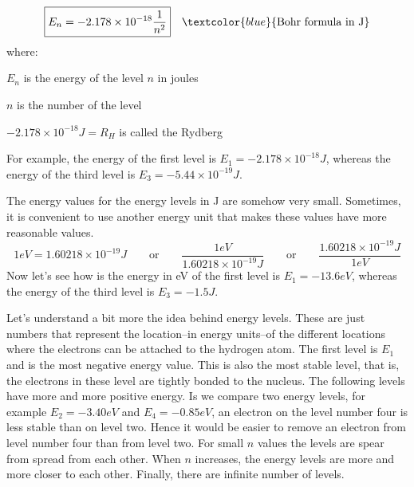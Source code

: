 \documentclass[main.tex]{subfiles}
\begin{document}
\begin{description}
\begin{equation*}
\boxed{  E_n=-2.178\times 10^{-18}  \frac{1}{n^2}  } \quad \textcolor{blue}{\text{Bohr formula in J}}
\end{equation*}
where:
\begin{where}
 \item $E_n$   is the energy of the level $n$ in joules
 \item $n$  is the number of the level
  \item $-2.178\times 10^{-18}J=R_H$  is called the Rydberg
\end{where}
For example, the energy of the first level is $E_1=-2.178\times 10^{-18}J$, whereas the energy of the third level is $E_3=-5.44\times 10^{-19}J$.
\item[\docfilehook{Electron-Volt a new unit of energy}{Electron-Volt a new unit of energy}]
The energy values for the energy levels in J are somehow very small. Sometimes, it is convenient to use another energy unit that makes these values have more reasonable values.%
\begin{equation*}
\boxed{    1 eV=1.60218\times 10^{-19} J   } \qquad\text{or}\qquad  \boxed{\frac{1 eV}{1.60218\times 10^{-19} J }}\qquad\text{or}\qquad  \boxed{\frac{1.60218\times 10^{-19} J }{1 eV}}
\end{equation*}
Now let's see how is the energy in eV of the first level is $E_1=-13.6eV$, whereas the energy of the third level is $E_3=-1.5J$.

\item[\docfilehook{Energy levels of hydrogen}{Energy levels of hydrogen}]
Let's understand a bit more the idea behind energy levels. These are just numbers that represent the location--in energy units--of the different locations where the electrons can be attached to the hydrogen atom. The first level is $E_1$ and is the most negative energy value. This is also the most stable level, that is, the electrons in these level are tightly bonded to the nucleus. The following levels have more and more positive energy. Is we compare two energy levels, for example $E_2=-3.40eV$ and $E_4=-0.85eV$, an electron on the level number four is less stable than on level two. Hence it would be easier to remove an electron from level number four than from level two. For small $n$ values the levels are spear from spread from each other. When $n$ increases, the energy levels are more and more closer to each other. Finally, there are infinite number of levels.
  \begin{marginfigure}[-4cm]
\end{marginfigure}
\end{description}
\end{document}
